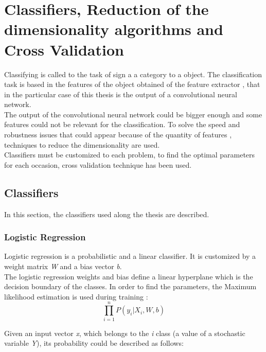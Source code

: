 \section{Classifiers, Reduction of the dimensionality algorithms and Cross Validation}
Classifying is called to the task of sign a a category to a object. The classification task is based in the features of the object obtained of the feature extractor \cite{Duda}, that in the particular case of this thesis is the output of a convolutional neural network.\\

The output of the convolutional neural network could be bigger enough and some features could not be relevant for the classification. To solve the speed and robustness issues that could appear because of the quantity of features \cite{PCAvsLDA}, techniques to reduce the dimensionality are used.\\

Classifiers must be customized to each problem, to find the optimal parameters for each occasion, cross validation technique has been used.\\

\subsection{Classifiers}
In this section, the classifiers used along the thesis are described.\\

\subsubsection{Logistic Regression}
Logistic regression is a probabilistic and a linear classifier. It is customized by a weight matrix \textit{W} and a bias vector \textit{b}.\\

The logistic regression weights and bias define a linear hyperplane which is the decision boundary of the classes. In order to find the parameters, the Maximum likelihood estimation is used during training \cite{ClassifiersReview}:\\

\begin{equation}
\prod_{i=1}^{n}P(y_i|X_i,W,b)
\end{equation}

Given an input vector \textit{x}, which belongs to the \textit{i} class (a value of a stochastic variable \textit{Y}), its probability could be described as follows:

